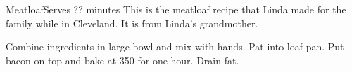 \begin{recipe}{Meatloaf}{Serves ?}{? minutes}
\freeform This is the meatloaf recipe that Linda made for the family while in Cleveland.  It is from Linda's grandmother.

Combine ingredients in large bowl and mix with hands. Pat into loaf pan.
Put bacon on top and bake at 350\0 for one hour.  Drain fat.
\end{recipe}
